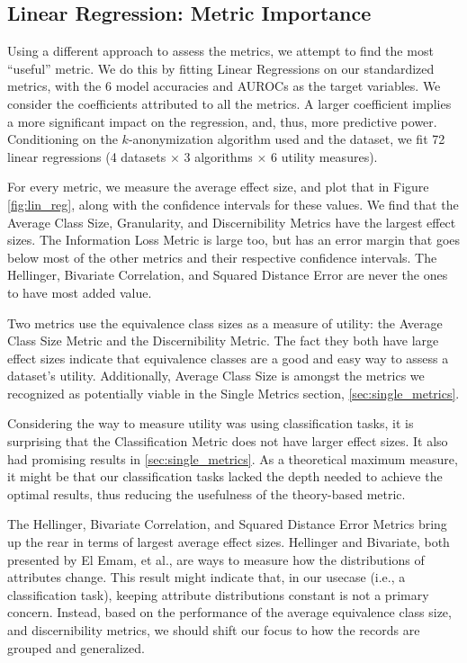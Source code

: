 \subsection{Linear Regression: Metric Importance}
Using a different approach to assess the metrics, we attempt to find the most ``useful'' metric. We do this by fitting Linear Regressions on our standardized metrics, with the 6 model accuracies and AUROCs as the target variables. We consider the coefficients attributed to all the metrics. A larger coefficient implies a more significant impact on the regression, and, thus, more predictive power. Conditioning on the $k$-anonymization algorithm used and the dataset, we fit 72 linear regressions (4 datasets $\times$ 3 algorithms $\times$ 6 utility measures). 

For every metric, we measure the average effect size, and plot that in Figure \ref{fig:lin_reg}, along with the confidence intervals for these values. We find that the Average Class Size, Granularity, and Discernibility Metrics have the largest effect sizes. The Information Loss Metric is large too, but has an error margin that goes below most of the other metrics and their respective confidence intervals. The Hellinger, Bivariate Correlation, and Squared Distance Error are never the ones to have most added value.

Two metrics use the equivalence class sizes as a measure of utility: the Average Class Size Metric and the Discernibility Metric. The fact they both have large effect sizes indicate that equivalence classes are a good and easy way to assess a dataset's utility. Additionally, Average Class Size is amongst the metrics we recognized as potentially viable in the Single Metrics section, \ref{sec:single_metrics}.

Considering the way to measure utility was using classification tasks, it is surprising that the Classification Metric does not have larger effect sizes. It also had promising results in \ref{sec:single_metrics}. As a theoretical maximum measure, it might be that our classification tasks lacked the depth needed to achieve the optimal results, thus reducing the usefulness of the theory-based metric. 

The Hellinger, Bivariate Correlation, and Squared Distance Error Metrics bring up the rear in terms of largest average effect sizes. Hellinger and Bivariate, both presented by El Emam, et al., are ways to measure how the distributions of attributes change. This result might indicate that, in our usecase (i.e., a classification task), keeping attribute distributions constant is not a primary concern. Instead, based on the performance of the average equivalence class size, and discernibility metrics, we should shift our focus to how the records are grouped and generalized.

